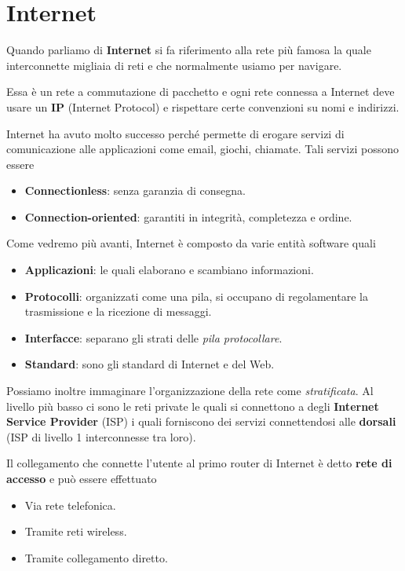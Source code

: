\section{Internet}
Quando parliamo di \textbf{Internet} si fa riferimento alla rete più famosa la quale interconnette
migliaia di reti e che normalmente usiamo per navigare.

Essa è un rete a commutazione di pacchetto e ogni rete connessa a Internet deve usare un
\textbf{IP} (Internet Protocol) e rispettare certe convenzioni su nomi e indirizzi.

Internet ha avuto molto successo perché permette di erogare servizi di comunicazione alle
applicazioni come email, giochi, chiamate. Tali servizi possono essere
\begin{itemize}
	\item \textbf{Connectionless}: senza garanzia di consegna.
	\item \textbf{Connection-oriented}: garantiti in integrità, completezza e ordine.
\end{itemize}
Come vedremo più avanti, Internet è composto da varie entità software quali
\begin{itemize}
	\item \textbf{Applicazioni}: le quali elaborano e scambiano informazioni.
	\item \textbf{Protocolli}: organizzati come una pila, si occupano di regolamentare la
		trasmissione e la ricezione di messaggi.
	\item \textbf{Interfacce}: separano gli strati delle \emph{pila protocollare}.
	\item \textbf{Standard}: sono gli standard di Internet e del Web.
\end{itemize}
Possiamo inoltre immaginare l'organizzazione della rete come \emph{stratificata}. Al livello più
basso ci sono le reti private le quali si connettono a degli \textbf{Internet Service Provider}
(ISP) i quali forniscono dei servizi connettendosi alle \textbf{dorsali} (ISP di livello 1
interconnesse tra loro).

Il collegamento che connette l'utente al primo router di Internet è detto \textbf{rete di accesso}
e può essere effettuato
\begin{itemize}
	\item Via rete telefonica.
	\item Tramite reti wireless.
	\item Tramite collegamento diretto.
\end{itemize}

